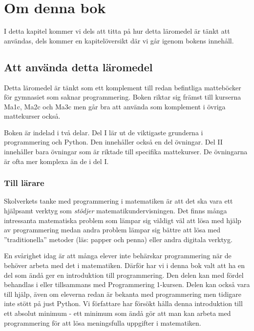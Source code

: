 %
%

\chapter{Om denna bok}\label{ch:ombok}
I detta kapitel kommer vi dels att titta på hur detta läromedel är tänkt att användas, dels kommer en kapitelöversikt där vi går igenom bokens innehåll.

\section{Att använda detta läromedel}
Detta läromedel är tänkt som ett komplement till redan befintliga matteböcker för gymnasiet som saknar programmering. Boken riktar sig främst till kurserna Ma1c, Ma2c och Ma3c men går bra att använda som komplement i övriga mattekurser också.

Boken är indelad i två delar. Del I lär ut de viktigaste grunderna i programmering och Python. Den innehåller också en del övningar. Del II innehåller bara övningar som är riktade till specifika mattekurser. De övningarna är ofta mer komplexa än de i del I.

\subsection{Till lärare}
Skolverkets tanke med programmering i matematiken är att det ska vara ett hjälpsamt verktyg som \emph{stödjer} matematikundervisningen. Det finns många intressanta matematiska problem som lämpar sig väldigt väl att lösa med hjälp av programmering medan andra problem lämpar sig bättre att lösa med ''traditionella'' metoder (läs: papper och penna) eller andra digitala verktyg.

En svårighet idag är att många elever inte behärskar programmering när de behöver arbeta med det i matematiken. Därför har vi i denna bok valt att ha en del som ändå ger en introduktion till programmering. Den delen kan med fördel behandlas i eller tillsammans med Programmering 1-kursen. Delen kan också vara till hjälp, även om eleverna redan är bekanta med programmering men tidigare inte stött på just Python. Vi författare har försökt hålla denna introduktion till ett absolut minimum - ett minimum som ändå gör att man kan arbeta med programmering för att lösa meningsfulla uppgifter i matematiken.

